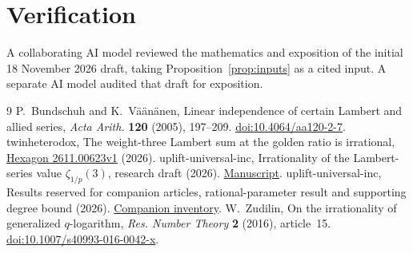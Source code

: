 \documentclass[11pt,letterpaper]{article}
\numberwithin{equation}{section}
\begin{document}
\section*{Verification}
A collaborating AI model reviewed the mathematics and exposition of the
initial 18 November 2026 draft, taking Proposition~\ref{prop:inputs}
as a cited input. A separate AI model audited that draft for exposition.

\small
\begin{thebibliography}{9}
\setlength{\itemsep}{1pt}
 P.~Bundschuh and K.~V\"a\"an\"anen, Linear independence of certain
Lambert and allied series, \emph{Acta Arith.} \textbf{120} (2005), 197--209.
\href{https://doi.org/10.4064/aa120-2-7}{doi:10.4064/aa120-2-7}.
 twinheterodox, The weight-three Lambert sum at the
golden ratio is irrational, \href{https://hexagonmath.org/2611.00623v1}{Hexagon 2611.00623v1} (2026).
 uplift-universal-inc, Irrationality of the Lambert-series
value \(\zeta_{1/p}(3)\), research draft (2026).
\href{https://github.com/uplift-universal-inc/qzeta_3-irrationality/blob/main/paper/main.pdf}{Manuscript}.
 uplift-universal-inc, Results reserved for companion
articles, rational-parameter result and supporting degree bound (2026).
\href{https://github.com/uplift-universal-inc/qzeta_3-irrationality/blob/main/docs/FUTURE_RESULTS.md}{Companion inventory}.
 W.~Zudilin, On the irrationality of generalized
\(q\)-logarithm, \emph{Res. Number Theory} \textbf{2} (2016), article~15.
\href{https://doi.org/10.1007/s40993-016-0042-x}{doi:10.1007/s40993-016-0042-x}.
\end{thebibliography}
\end{document}

